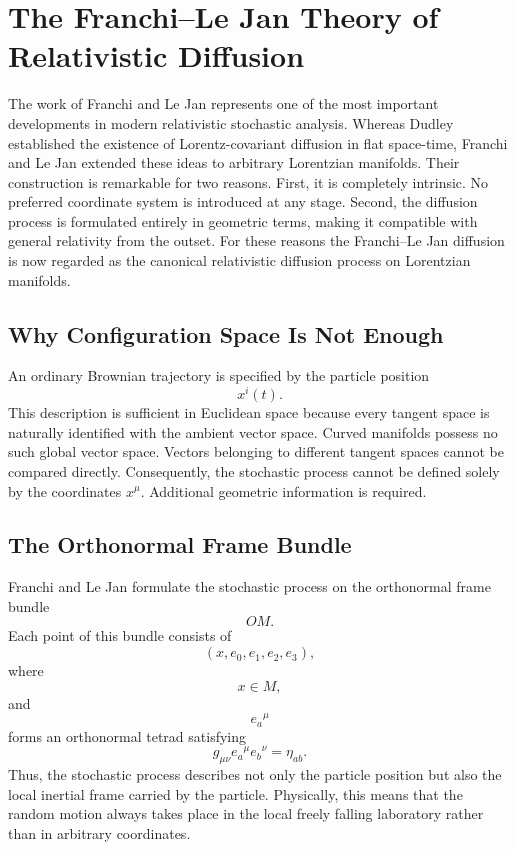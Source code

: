 \section{The Franchi--Le Jan Theory of Relativistic Diffusion}
\label{sec:FranchiLeJan}
The work of Franchi and Le Jan represents one of the most important
developments in modern relativistic stochastic analysis.
Whereas Dudley established the existence of Lorentz-covariant diffusion
in flat space-time, Franchi and Le Jan extended these ideas to
arbitrary Lorentzian manifolds.
Their construction is remarkable for two reasons.
First, it is completely intrinsic.
No preferred coordinate system is introduced at any stage.
Second, the diffusion process is formulated entirely in geometric terms,
making it compatible with general relativity from the outset.
For these reasons the Franchi--Le Jan diffusion is now regarded as the
canonical relativistic diffusion process on Lorentzian manifolds.
\subsection{Why Configuration Space Is Not Enough}
An ordinary Brownian trajectory is specified by the particle position
\[x^i(t).\]
This description is sufficient in Euclidean space because every tangent
space is naturally identified with the ambient vector space.
Curved manifolds possess no such global vector space.
Vectors belonging to different tangent spaces cannot be compared
directly.
Consequently,
the stochastic process cannot be defined solely by the coordinates
$x^\mu$.
Additional geometric information is required.
\subsection{The Orthonormal Frame Bundle}
Franchi and Le Jan formulate the stochastic process on the orthonormal
frame bundle
\[OM.\]
Each point of this bundle consists of
\[(x,e_0,e_1,e_2,e_3),\]
where
\[x\in M,\]
and
\[e_a{}^\mu\]
forms an orthonormal tetrad satisfying
\[g_{\mu\nu}e_a{}^\mu e_b{}^\nu=\eta_{ab}.\]
Thus,
the stochastic process describes not only the particle position but
also the local inertial frame carried by the particle.
Physically,
this means that the random motion always takes place in the local
freely falling laboratory rather than in arbitrary coordinates.
